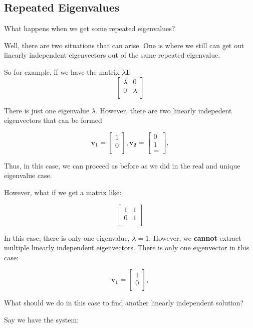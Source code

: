 \documentclass{report}
\begin{document}
\subsection{Repeated Eigenvalues}
What happens when we get some repeated eigenvalues?

Well, there are two situations that can arise. One is where we still can get out linearly independent eigenvectors out of the same repeated eigenvalue.

So for example, if we have the matrix $\lambda\mathbf{I}$:
$$
\begin{bmatrix}
    \lambda & 0  \\
    0 & \lambda  \\
\end{bmatrix}
$$

There is just one eigenvalue $\lambda$. However, there are two linearly indepedent eigenvectors that can be formed 

$$
\mathbf{v_1}
=
\begin{bmatrix}
    1 \\
    0 \\
\end{bmatrix},
\mathbf{v_2}
=
\begin{bmatrix}
    0 \\
    1 \\
=\end{bmatrix},
$$

Thus, in this case, we can proceed as before as we did in the real and unique eigenvalue case.

However, what if we get a matrix like:

$$
\begin{bmatrix}
    1 & 1  \\
    0 & 1  \\
\end{bmatrix}
$$

In this case, there is only one eigenvalue, $\lambda = 1$. However, we \textbf{cannot} extract multiple linearly independent eigenvectors. There is only one eigenvector in this case:

$$
\mathbf{v_1}
=
\begin{bmatrix}
    1 \\
    0 \\
\end{bmatrix},
$$

What should we do in this case to find another linearly independent solution?


Say we have the system:
\end{document}
